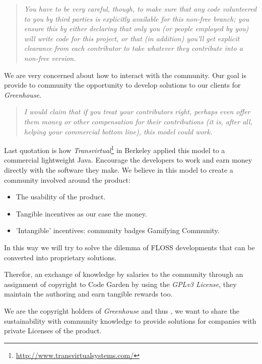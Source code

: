 \documentclass[11pt]{scrartcl}
\begin{document}
\begin{quotation}
    \emph{You have to be very careful, though, to make sure that any code volunteered to you by third parties is explicitly available for this non-free branch; you ensure this by either declaring that only you (or people employed by you) will write code for this project, or that (in addition) you'll get explicit clearance from each contributor to take whatever they contribute into a non-free version.}
\end{quotation}

\par We are very concerned about how to interact with the community. Our goal is provide to community the opportunity to develop solutions to our clients for \emph{Greenhouse}.

\begin{quotation}
    \emph{I would claim that if you treat your contributors right, perhaps even offer them money or other compensation for their contributions (it is, after all, helping your commercial bottom line), this model could work.}
\end{quotation}

\par Last quotation is how \emph{Transvirtual}\footnote{\url{http://www.transvirtualsystems.com/}} in Berkeley applied this model to a commercial lightweight Java. Encourage the developers to work and earn money directly with the software they make. We believe in this model to create a community involved around the product: 

\begin{itemize}
	\item The usability of the product.
	\item Tangible incentives as our case the money.
	\item 'Intangible' incentives: community badges Gamifying Community\cite{gamifying}.
\end{itemize}

\par In this way we will try to solve the dilemma of FLOSS developments that can be converted into proprietary solutions.

\par Therefor, an exchange of knowledge by salaries to the community through an assignment of copyright to Code Garden by using the \emph{GPLv3 License}, they maintain the authoring and earn tangible rewards too.

\par We are the copyright holders of \emph{Greenhouse} and thus , we want to share the sustainability with community knowledge to provide solutions for companies with private Licenses of the product.
\end{document}
